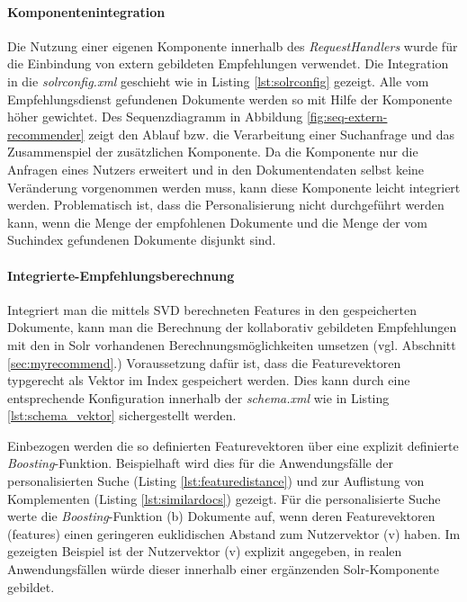 \paragraph{Komponentenintegration}  Die Nutzung einer eigenen Komponente innerhalb des \textit{RequestHandlers} wurde für die Einbindung von extern gebildeten Empfehlungen verwendet. Die Integration in die \textit{solrconfig.xml} geschieht wie in Listing \ref{lst:solrconfig} gezeigt. Alle vom Empfehlungsdienst gefundenen Dokumente werden so mit Hilfe der Komponente höher gewichtet. Des Sequenzdiagramm in Abbildung \ref{fig:seq-extern-recommender} zeigt den Ablauf bzw. die Verarbeitung einer Suchanfrage und das Zusammenspiel der zusätzlichen Komponente. Da die Komponente nur die Anfragen eines Nutzers erweitert und in den Dokumentendaten selbst keine Veränderung vorgenommen werden muss, kann diese Komponente  leicht integriert werden. Problematisch ist, dass die Personalisierung nicht durchgeführt werden kann, wenn die Menge der empfohlenen Dokumente und die Menge der vom Suchindex gefundenen Dokumente disjunkt sind.



\paragraph{Integrierte-Empfehlungsberechnung} Integriert man die mittels SVD berechneten Features in den gespeicherten Dokumente, kann man die Berechnung der kollaborativ gebildeten Empfehlungen mit den in Solr vorhandenen Berechnungsmöglichkeiten umsetzen (vgl.  Abschnitt \ref{sec:myrecommend}.) Voraussetzung dafür ist, dass die Featurevektoren typgerecht als Vektor im Index gespeichert werden. Dies kann durch eine entsprechende Konfiguration innerhalb der \textit{schema.xml} wie in Listing \ref{lst:schema_vektor} sichergestellt werden.



Einbezogen werden die so definierten Featurevektoren über eine explizit definierte \textit{Boosting}-Funktion. Beispielhaft wird dies für die Anwendungsfälle der personalisierten Suche (Listing \ref{lst:featuredistance}) und zur Auflistung von Komplementen (Listing \ref{lst:similardocs}) gezeigt. Für die personalisierte Suche werte die \textit{Boosting}-Funktion (b) Dokumente auf, wenn deren Featurevektoren (features) einen geringeren euklidischen Abstand zum Nutzervektor (v) haben. Im gezeigten Beispiel ist der Nutzervektor (v) explizit angegeben, in realen Anwendungsfällen würde dieser innerhalb einer  ergänzenden Solr-Komponente gebildet.


